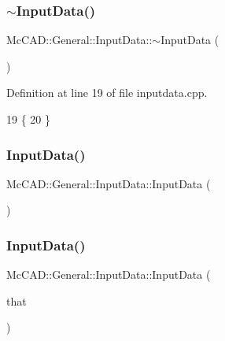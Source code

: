 \subsubsection{\texorpdfstring{$\sim$\+Input\+Data()}{~InputData()}\hspace{0.1cm}{\footnotesize\ttfamily [1/2]}}
{\footnotesize\ttfamily Mc\+C\+A\+D\+::\+General\+::\+Input\+Data\+::$\sim$\+Input\+Data (\begin{DoxyParamCaption}{ }\end{DoxyParamCaption})}



Definition at line 19 of file inputdata.\+cpp.


\begin{DoxyCode}
19                                  \{
20 \}
\end{DoxyCode}
\mbox{\label{classMcCAD_1_1General_1_1InputData_a73842cb82b9c9992dee53ba766a5994c}} 
\subsubsection{\texorpdfstring{Input\+Data()}{InputData()}\hspace{0.1cm}{\footnotesize\ttfamily [4/6]}}
{\footnotesize\ttfamily Mc\+C\+A\+D\+::\+General\+::\+Input\+Data\+::\+Input\+Data (\begin{DoxyParamCaption}{ }\end{DoxyParamCaption})}

\mbox{\label{classMcCAD_1_1General_1_1InputData_a1f1ffe8e5b1226b01da7916bdf5b59eb}} 
\subsubsection{\texorpdfstring{Input\+Data()}{InputData()}\hspace{0.1cm}{\footnotesize\ttfamily [5/6]}}
{\footnotesize\ttfamily Mc\+C\+A\+D\+::\+General\+::\+Input\+Data\+::\+Input\+Data (\begin{DoxyParamCaption}\item[{const \hyperlink{classMcCAD_1_1General_1_1InputData}{Input\+Data} \&}]{that }\end{DoxyParamCaption})}

